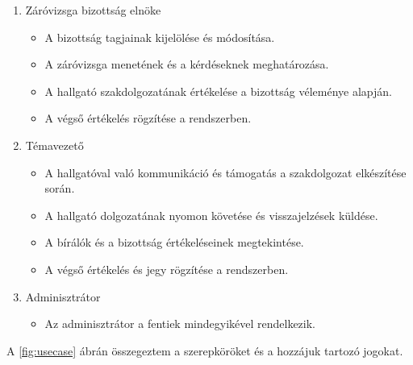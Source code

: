 \begin{enumerate}
\newpage
\item Záróvizsga bizottság elnöke
\begin{itemize}
\item A bizottság tagjainak kijelölése és módosítása.

\item A záróvizsga menetének és a kérdéseknek meghatározása.

\item A hallgató szakdolgozatának értékelése a bizottság véleménye alapján.

\item A végső értékelés rögzítése a rendszerben.
\end{itemize}

\item Témavezető

\begin{itemize}
\item A hallgatóval való kommunikáció és támogatás a szakdolgozat elkészítése során.

\item A hallgató dolgozatának nyomon követése és visszajelzések küldése.

\item A bírálók és a bizottság értékeléseinek megtekintése.

\item A végső értékelés és jegy rögzítése a rendszerben.


\end{itemize}

\item Adminisztrátor

\begin{itemize}

\item Az adminisztrátor a fentiek mindegyikével rendelkezik.

\end{itemize}

\end{enumerate}

A \ref{fig:usecase} ábrán összegeztem a szerepköröket és a hozzájuk tartozó jogokat.

